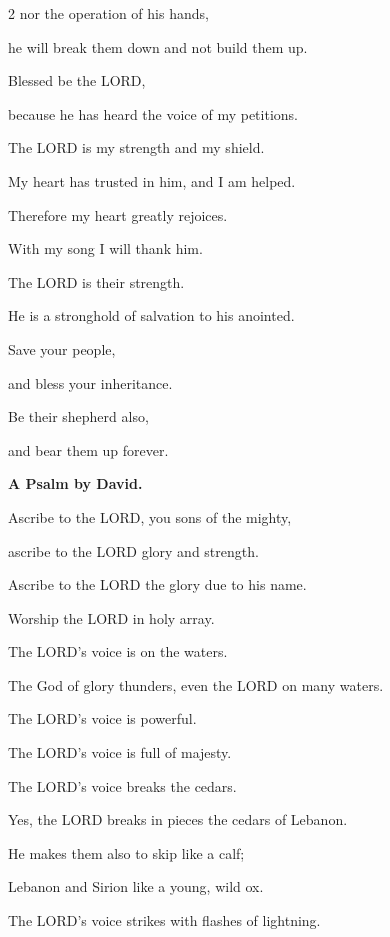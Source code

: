 \begin{multicols}{2}
	nor the operation of his hands,
	
	he will break them down and not build them up.
	
	\vspace{\baselineskip}
	
	\myverse{}Blessed be the LORD,
	
	because he has heard the voice of my petitions.
	
	
	\myverse{}The LORD is my strength and my shield.
	
	My heart has trusted in him, and I am helped.
	
	Therefore my heart greatly rejoices.
	
	With my song I will thank him.
	
	
	\myverse{}The LORD is their strength.
	
	He is a stronghold of salvation to his anointed.
	
	
	\myverse{}Save your people,
	
	and bless your inheritance.
	
	Be their shepherd also,
	
	and bear them up forever.
	
	
	\mychapter{}\textbf{A Psalm by David.}
	
	\quad \myverse*{}Ascribe to the LORD, you sons of the mighty,
	
	ascribe to the LORD glory and strength.
	
	
	\myverse{}Ascribe to the LORD the glory due to his name.
	
	Worship the LORD in holy array.
	
	\vspace{\baselineskip}
	
	\myverse{}The LORD’s voice is on the waters.
	
	The God of glory thunders, even the LORD on many waters.
	
	
	\myverse{}The LORD’s voice is powerful.
	
	The LORD’s voice is full of majesty.
	
	
	\myverse{}The LORD’s voice breaks the cedars.
	
	Yes, the LORD breaks in pieces the cedars of Lebanon.
	
	
	\myverse{}He makes them also to skip like a calf;
	
	Lebanon and Sirion like a young, wild ox.
	
	
	\myverse{}The LORD’s voice strikes with flashes of lightning.
	

\end{multicols}
